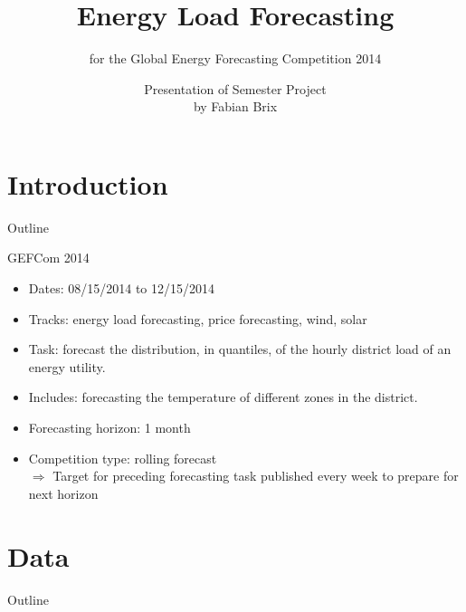 \documentclass{beamer}
\author{Presentation of Semester Project\\by Fabian Brix}
\title{Energy Load Forecasting}
\subtitle{for the Global Energy Forecasting Competition 2014}
\institute{\ig[width=0.3\paperwidth]{EPFL_LOG_QUADRI_Red.eps}}
\begin{document}
 

\frame{\titlepage}

\section{Introduction}
\begin{frame}[noframenumbering]{Outline}
\tableofcontents[currentsection]
\end{frame}
\begin{frame}{GEFCom 2014}
\begin{itemize}
\item Dates: 08/15/2014 to 12/15/2014
\bigskip
\pause
\item Tracks: energy \textcolor{bostonuniversityred}{load forecasting}, price forecasting, wind, solar
\pause
\item Task: forecast the distribution, in quantiles, of the hourly district load of an energy utility. 
\pause
\item Includes: forecasting the temperature of different zones in the district.
\pause
\item Forecasting horizon: 1 month
\pause
\item Competition type: rolling forecast\\
\pause
$\Rightarrow$ Target for preceding forecasting task published every week to prepare for next horizon
\end{itemize}
\end{frame}



\section{Data}
\begin{frame}[noframenumbering]{Outline}
\tableofcontents[currentsection]
\end{frame}
\end{document}
